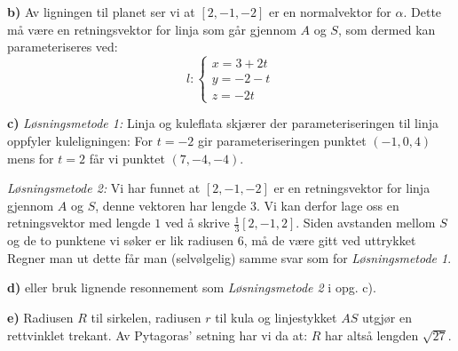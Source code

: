 \textbf{b)} Av ligningen til planet ser vi at $ [2, -1, -2] $ er en normalvektor for $ \alpha $. Dette må være en retningsvektor for linja som går gjennom $ A $ og $ S $, som dermed kan parameteriseres ved:
\[ l: \left\lbrace{
	\begin{array}{l}
	x=3+ 2t  \\
	y=-2-t   \\
	z=-2t
	\end{array}
}\right.  \]

\textbf{c)} \textit{Løsningsmetode 1:}
Linja og kuleflata skjærer der parameteriseringen til linja oppfyler kuleligningen:
For $ t=-2 $ gir parameteriseringen punktet $ (-1, 0, 4) $ mens for $ t=2 $ får vi punktet $ (7, -4, -4) $.

\textit{Løsningsmetode 2:} Vi har funnet at $ [2, -1, -2] $ er en retningsvektor for linja gjennom $ A $ og $ S $, denne vektoren har lengde 3. Vi kan derfor lage oss en retningsvektor med lengde $ 1 $ ved å skrive $ \frac{1}{3}[2, -1, 2] $. Siden avstanden mellom $ S $ og de to punktene vi søker er lik radiusen 6, må de være gitt ved uttrykket
Regner man ut dette får man (selvølgelig) samme svar som for \textit{Løsningsmetode 1}.

\textbf{d)}  eller bruk lignende resonnement som \textit{Løsningsmetode 2} i opg. c).

\textbf{e)} Radiusen $ R $ til sirkelen, radiusen $ r $ til kula og linjestykket $ AS $ utgjør en rettvinklet trekant. Av Pytagoras' setning har vi da at:
$ R $ har altså lengden $ \sqrt{27} $.
